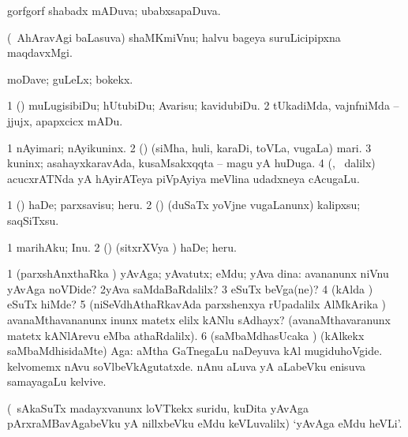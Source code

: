 {{{{{{\bentry
{} 
\gl{\gu}
\bmng
gorfgorf shabadx mADuva; ubabxsapaDuva. 
\emng
\eentry

\bentry
{} 
\gl{\nA}
\expl{}
\bmng
(\kanmu\ AhAravAgi baLasuva) shaMKmiVnu; halvu bageya suruLicipipxna maqdavxMgi. 
\emng
\eentry

\bentry
{}
\gl{\nA}
\expl{}
\bmng
moDave; guLeLx; bokekx. 
\emng
\eentry

\bentry
{} 
\gl{\sakirx}
\expl{}
\bmng
\bnum
\num{1} (\kAparx) muLugisibiDu; hUtubiDu; Avarisu; kavidubiDu. 
\num{2} tUkadiMda, vajnfniMda -- jjujx, apapxcicx mADu. 
\enum
\emng
\eentry

\bentry
{} 
\gl{\nA}
\expl{}
\bmng
\bnum
\num{1} nAyimari; nAyikuninx. 
\num{2} (\pArxparx) (siMha, huli, karaDi, toVLa, \mo vugaLa) mari. 
\num{3} kuninx; asahayxkaravAda, kusaMsakxqqta -- magu yA huDuga. 
\num{4} (\nw, \kanmu\ \bava dalilx) acucxrATNda yA hAyirATeya piVpAyiya meVlina udadxneya cAcugaLu. 
\enum
\emng
\eentry

\bentry
{} 
\gl{\sakirx}
\expl{}
\bmng
\bnum
\num{1} (\hiV) haDe; parxsavisu; heru. 
\num{2} (\rUpa) (duSaTx yoVjne \mo vugaLanunx) kalipxsu; saqSiTxsu. 
\enum
\emng

\noindent 
\gl{\akirx}
\expl{}
\bmng
\bnum
\num{1} marihAku; Inu. 
\num{2} (\hiV) (sitxrXVya \vi) haDe; heru. 
\enum
\emng
\eentry

\bentry
{} 
\gl{\kirxvi}
\expl{}
\bmng
\bnum
\num{1} (parxshAnxthaRka \kirxvi) yAvAga; yAvatutx; eMdu; yAva dina:  avananunx niVnu yAvAga noVDide? 
\num{2}yAva saMdaBaRdalilx? 
\num{3} eSuTx beVga(ne)? 
\num{4} (kAlda \vi) eSuTx hiMde? 
\num{5} (niSeVdhAthaRkavAda parxshenxya rUpadalilx AlMkArika \parx)  avanaMthavananunx inunx matetx elilx kANlu sAdhayx? (avanaMthavaranunx matetx kANlArevu eMba athaRdalilx). 
\num{6} (saMbaMdhasUcaka \kirxvi) (kAlkekx saMbaMdhisidaMte) Aga:  aMtha GaTnegaLu naDeyuva kAl mugiduhoVgide.  kelvomemx nAvu soVlbeVkAgutatxde.  nAnu aLuva yA aLabeVku enisuva samayagaLu kelvive. 
\enum
\emng

\noindent 
\gl{\pagu}
\expl{}
\bmng
{} (\kanmu\ sAkaSuTx madayxvanunx loVTkekx suridu, kuDita yAvAga pArxraMBavAgabeVku yA nillxbeVku eMdu keVLuvalilx) `yAvAga eMdu heVLi'. 
\emng
\eentry

}}}}}}

